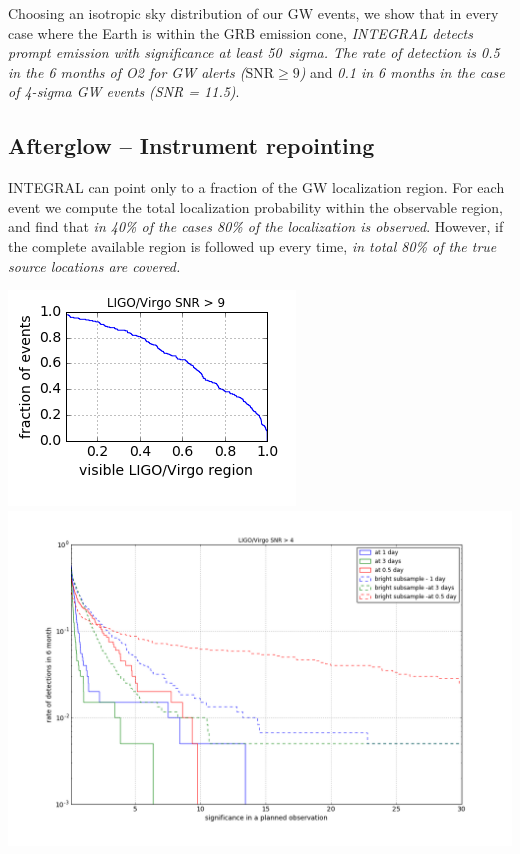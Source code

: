 \documentclass[12pt, a4]{article}
\begin{document}
Choosing an isotropic sky distribution of our GW events, we show that
in every case where the Earth is within the GRB emission cone,
\emph{INTEGRAL detects prompt emission with significance at least 50~sigma.
The rate of detection is 0.5 in the 6 months of O2 for GW alerts ($\mathrm{SNR} \geq 9$)} 
and \emph{0.1 in 6 months  in the case of 4-sigma GW events (SNR = 11.5)}.

\subsection*{Afterglow -- Instrument repointing}

INTEGRAL can point only to a fraction of the GW localization region. For each
event we compute the total localization probability within the observable
region, and find that \emph{in 40\% of the cases 80\% of the localization is
observed}. However, if the complete available region is followed up every
time, \emph{in total 80\% of the true source locations are covered.}

\begin{center}
  \includegraphics[scale=.5]{covered_region_9_-1_normed.png}
  \includegraphics[scale=.4]{significance_vs_rate_af.png}

    \label{covered_region}
\end{center}
\end{document}
